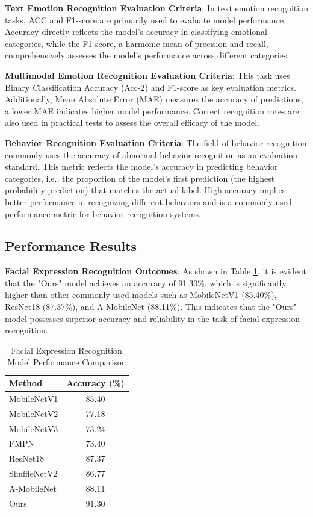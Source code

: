 \documentclass[preprint,12pt]{elsarticle}
\begin{document}
\textbf{Text Emotion Recognition Evaluation Criteria}: In text emotion recognition tasks, ACC and F1-score are primarily used to evaluate model performance. Accuracy directly reflects the model's accuracy in classifying emotional categories, while the F1-score, a harmonic mean of precision and recall, comprehensively assesses the model's performance across different categories.

\textbf{Multimodal Emotion Recognition Evaluation Criteria}: This task uses Binary Classification Accuracy (Acc-2) and F1-score as key evaluation metrics. Additionally, Mean Absolute Error (MAE) measures the accuracy of predictions; a lower MAE indicates higher model performance. Correct recognition rates are also used in practical tests to assess the overall efficacy of the model.

\textbf{Behavior Recognition Evaluation Criteria}: The field of behavior recognition commonly uses the accuracy of abnormal behavior recognition as an evaluation standard. This metric reflects the model's accuracy in predicting behavior categories, i.e., the proportion of the model's first prediction (the highest probability prediction) that matches the actual label. High accuracy implies better performance in recognizing different behaviors and is a commonly used performance metric for behavior recognition systems.


\subsection{Performance Results}

\textbf{Facial Expression Recognition Outcomes}: As shown in Table \ref{Table1}, it is evident that the "Ours" model achieves an accuracy of 91.30\%, which is significantly higher than other commonly used models such as MobileNetV1 (85.40\%), ResNet18 (87.37\%), and A-MobileNet (88.11\%). This indicates that the "Ours" model possesses superior accuracy and reliability in the task of facial expression recognition.
\begin{table}[ht]
\centering
\caption{Facial Expression Recognition Model Performance Comparison}\label{Table1}
\begin{tabular}{lc}
\hline
Method              & Accuracy (\%) \\
\hline
MobileNetV1         & 85.40        \\
MobileNetV2         & 77.18        \\
MobileNetV3         & 73.24        \\
FMPN                & 73.40        \\
ResNet18            & 87.37        \\
ShuffleNetV2        & 86.77        \\
A-MobileNet         & 88.11        \\
Ours                & 91.30        \\
\hline
\end{tabular}
\end{table}
\end{document}

